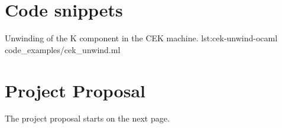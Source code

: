 \documentclass[%
    12pt,
    a4paper,
    bibliography=toc,
    listof=leveldown,%
    oneside
]{book}
\begin{document}
\begin{appendices}
\chapter{Code snippets}
\label{sec:code-snippets}
\setcounter{page}{1}

{Unwinding of the K component in the CEK machine.}
{lst:cek-unwind-ocaml}
{code_examples/cek_unwind.ml}

\chapter{Project Proposal}
\setcounter{page}{1}
The project proposal starts on the next page.


\end{appendices}
\end{document}
